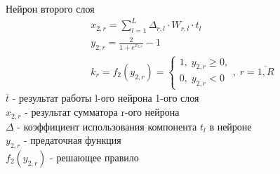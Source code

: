 \begin{frame}{Нейрон второго слоя}
    \begin{gather*}
        x_{2,r} = \sum_{l=1}^{L} \Delta_{r,l}\cdot W_{r,l}\cdot t_l \\
        y_{2,r} = \frac{2}{1 + e^{x_{2,r}}} - 1 \\
        k_r = f_2(y_{2,r}) = 
        \begin{cases}
            1,\; y_{2,r} \geq 0,\\
            0,\; y_{2,r} < 0
        \end{cases}
        ,\; r = \overline{1, R}
    \end{gather*}
    $\overline{t}$ - результат работы l-ого нейрона 1-ого слоя \\
    $x_{2,r}$ - результат сумматора r-ого нейрона \\
    $\Delta$ - коэффициент использования компонента $t_l$ в нейроне \\
    $y_{2,r}$ - предаточная функция \\
    $f_2(y_{2,r})$ - решающее правило \\
\end{frame}